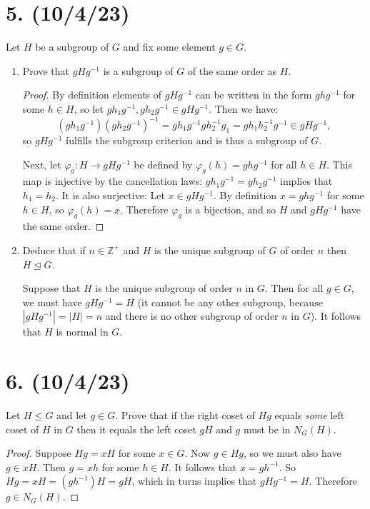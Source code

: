 \documentclass{article}
\begin{document}
\section*{5. (10/4/23)}

Let $H$ be a subgroup of $G$ and fix some element $g \in G$.

\begin{enumerate}[label=(\alph*), itemsep=0em]
    \item Prove that $gHg^{-1}$ is a subgroup of $G$ of the same order as $H$.
          \begin{proof}
            By definition elements of $gHg^{-1}$ can be written in the form $ghg^{-1}$ for some $h \in H$, so let $gh_1g^{-1}, gh_2g^{-1} \in gHg^{-1}$. Then we have:
            \begin{equation*}
                (gh_1g^{-1})(gh_2g^{-1})^{-1} = gh_1g^{-1}gh_2^{-1}g_1 = gh_1h_2^{-1}g^{-1} \in gHg^{-1},
            \end{equation*}
            so $gHg^{-1}$ fulfills the subgroup criterion and is thus a subgroup of $G$.

            Next, let $\varphi_g: H \rightarrow gHg^{-1}$ be defined by $\varphi_g(h) = ghg^{-1}$ for all $h \in H$. This map is injective by the cancellation laws: $gh_1g^{-1} = gh_2g^{-1}$ implies that $h_1 = h_2$. It is also surjective: Let $x \in gHg^{-1}$. By definition $x = ghg^{-1}$ for some $h \in H$, so $\varphi_g(h) = x$. Therefore $\varphi_g$ is a bijection, and so $H$ and $gHg^{-1}$ have the same order.
          \end{proof}
    \item Deduce that if $n \in \mathbb{Z}^+$ and $H$ is the unique subgroup of $G$ of order $n$ then $H \unlhd G$.

          Suppose that $H$ is the unique subgroup of order $n$ in $G$. Then for all $g \in G$, we must have $gHg^{-1} = H$ (it cannot be any other subgroup, because $|gHg^{-1}| = |H| = n$ and there is no other subgroup of order $n$ in $G$). It follows that $H$ is normal in $G$.
\end{enumerate}

\section*{6. (10/4/23)}

Let $H \leq G$ and let $g \in G$. Prove that if the right coset of $Hg$ equals \emph{some} left coset of $H$ in $G$ then it equals the left coset $gH$ and $g$ must be in $N_G(H)$.

\begin{proof}
    Suppose $Hg = xH$ for some $x \in G$. Now $g \in Hg$, so we must also have $g \in xH$. Then $g = xh$ for some $h \in H$. It follows that $x = gh^{-1}$. So $Hg = xH = (gh^{-1})H = gH$, which in turns implies that $gHg^{-1} = H$. Therefore $g \in N_G(H)$.
\end{proof}
\end{document}
